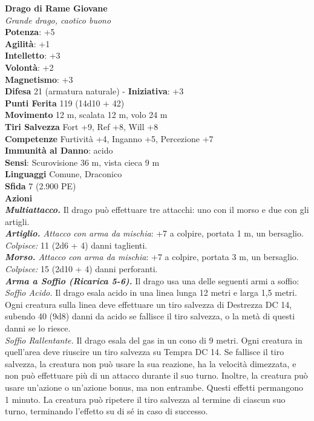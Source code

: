 \begin{multicols}{2}
\medskip\textbf{Drago di Rame Giovane}\\
\emph{Grande drago, caotico buono}\\
\textbf{Potenza}: +5\\
\textbf{Agilità}: +1\\
\textbf{Intelletto}: +3\\
\textbf{Volontà}: +2\\
\textbf{Magnetismo}: +3\\
\textbf{Difesa} 21 (armatura naturale) - \textbf{Iniziativa}: +3\\
\textbf{Punti Ferita} 119 (14d10 + 42)\\
\textbf{Movimento} 12 m, scalata 12 m, volo 24 m\\
\textbf{Tiri Salvezza} Fort +9, Ref +8, Will +8\\
\textbf{Competenze} Furtività +4, Inganno +5, Percezione +7\\
\textbf{Immunità al Danno}: acido\\
\textbf{Sensi}: Scurovisione 36 m, vista cieca 9 m\\
\textbf{Linguaggi} Comune, Draconico\\
\textbf{Sfida} 7 (2.900 PE)\smallskip\\
\smallskip\textbf{Azioni}\\
\emph{\textbf{Multiattacco.}} Il drago può effettuare tre attacchi: uno con il morso e due con gli artigli.\\
\emph{\textbf{Artiglio.} Attacco con arma da mischia}: +7 a colpire, portata 1 m, un bersaglio.\\
\emph{Colpisce:} 11 (2d6 + 4) danni taglienti.\\
\emph{\textbf{Morso.} Attacco con arma da mischia}: +7 a colpire, portata 3 m, un bersaglio.\\
\emph{Colpisce:} 15 (2d10 + 4) danni perforanti.\\
\emph{\textbf{Arma a Soffio (Ricarica 5-6).}} Il drago usa una delle seguenti armi a soffio:\\
\emph{Soffio Acido.} Il drago esala acido in una linea lunga 12 metri e larga 1,5 metri. Ogni creatura sulla linea deve effettuare un tiro salvezza di Destrezza DC 14, subendo 40 (9d8) danni da acido se fallisce il tiro salvezza, o la metà di questi danni se lo riesce.\\
\emph{Soffio Rallentante.} Il drago esala del gas in un cono di 9 metri. Ogni creatura in quell'area deve riuscire un tiro salvezza su Tempra DC 14. Se fallisce il tiro salvezza, la creatura non può usare la sua reazione, ha la velocità dimezzata, e non può effettuare più di un attacco durante il suo turno. Inoltre, la creatura può usare un'azione o un'azione bonus, ma non entrambe. Questi effetti permangono 1 minuto. La creatura può ripetere il tiro salvezza al termine di ciascun suo turno, terminando l'effetto su di sé in caso di successo.\\

\end{multicols}
